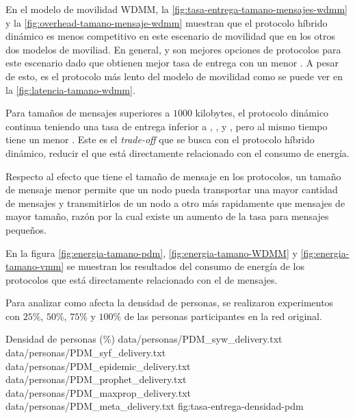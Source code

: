 En el modelo de movilidad WDMM, la \ref{fig:tasa-entrega-tamano-mensajes-wdmm}
y la \ref{fig:overhead-tamano-mensaje-wdmm} muestran que el protocolo híbrido
dinámico es menos competitivo en este escenario de movilidad que en los otros
dos modelos de moviliad. En general, \prophet{} y \syf{} son mejores opciones de
protocolos para este escenario dado que obtienen mejor tasa de entrega con un
menor \overhead. A pesar de esto, \syf{} es el protocolo más lento del modelo de
movilidad como se puede ver en la \ref{fig:latencia-tamano-wdmm}.

Para tamaños de mensajes superiores a $1000$ kilobytes, el protocolo dinámico
continua teniendo una tasa de entrega inferior a \epidemic, \prophet, \syf{} y
\maxprop, pero al mismo tiempo tiene un menor \overhead. Este es el
\textit{trade-off} que se busca con el protocolo híbrido dinámico, reducir el
\overhead{} que está directamente relacionado con el consumo de energía.

Respecto al efecto que tiene el tamaño de mensaje en los protocolos, un tamaño
de mensaje menor permite que un nodo pueda transportar una mayor cantidad de
mensajes y transmitirlos de un nodo a otro más rapidamente que mensajes de
mayor tamaño, razón por la cual existe un aumento de la tasa para mensajes
pequeños.

En la figura \ref{fig:energia-tamano-pdm}, \ref{fig:energia-tamano-WDMM} y
\ref{fig:energia-tamano-vmm} se muestran los resultados del consumo de energía
de los protocolos que está directamente relacionado con el \overhead{} de
mensajes.













Para analizar como afecta la densidad de personas, se realizaron experimentos
con $25\%$, $50\%$, $75\%$ y $100\%$ de las personas participantes en la red
original.





{
\graficoDeliveryProtocolos
{Densidad de personas (\%)}
{data/personas/PDM_syw_delivery.txt}
{data/personas/PDM_syf_delivery.txt}
{data/personas/PDM_epidemic_delivery.txt}
{data/personas/PDM_prophet_delivery.txt}
{data/personas/PDM_maxprop_delivery.txt}
{data/personas/PDM_meta_delivery.txt}
}{fig:tasa-entrega-densidad-pdm}


